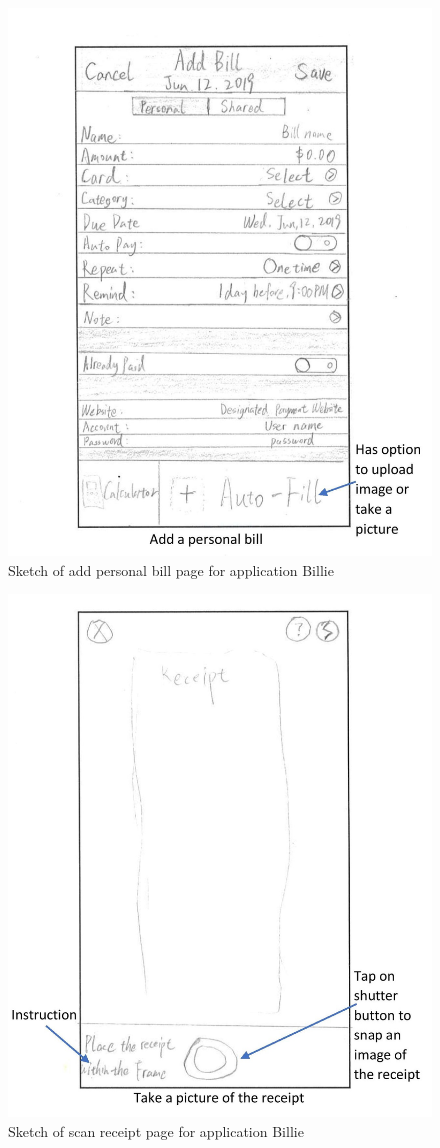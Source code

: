 \documentclass{sigchi}
\begin{document}
\begin{figure}[h!]
\centering
  \includegraphics[width=0.6\columnwidth]{7-add-bill-page.jpg}
  \caption{Sketch of add personal bill page for application Billie}
  \label{fig:figure22}
\end{figure}
\begin{figure}[h!]
\centering
  \includegraphics[width=0.6\columnwidth]{8-scan-image-page.jpg}
  \caption{Sketch of scan receipt page for application Billie}
  \label{fig:figure23}
\end{figure}
\end{document}
